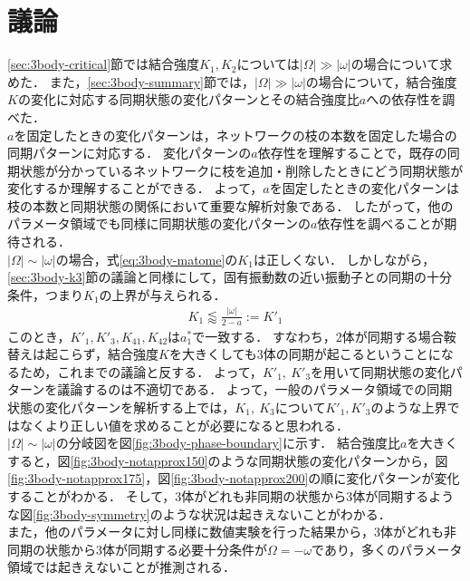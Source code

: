 \documentclass[../main]{subfiles}
\begin{document}
\section{議論}
\ref{sec:3body-critical}節では結合強度$K_1,K_2$については$|\Omega|\gg|\omega|$の場合について求めた．
また，\ref{sec:3body-summary}節では，$|\Omega|\gg|\omega|$の場合について，結合強度$K$の変化に対応する同期状態の変化パターンとその結合強度比$a$への依存性を調べた．\\
$a$を固定したときの変化パターンは，ネットワークの枝の本数を固定した場合の同期パターンに対応する．
変化パターンの$a$依存性を理解することで，既存の同期状態が分かっているネットワークに枝を追加・削除したときにどう同期状態が変化するか理解することができる．
よって，$a$を固定したときの変化パターンは枝の本数と同期状態の関係において重要な解析対象である．
したがって，他のパラメータ領域でも同様に同期状態の変化パターンの$a$依存性を調べることが期待される．\\
$|\Omega|\sim|\omega|$の場合，式\eqref{eq:3body-matome}の$K_1$は正しくない．
しかしながら，\ref{sec:3body-k3}節の議論と同様にして，固有振動数の近い振動子との同期の十分条件，つまり$K_1$の上界が与えられる．
\begin{align*}
    K_1\lessapprox\frac{|\omega|}{2-a}:=K'_1
\end{align*}
このとき，$K'_1, K'_3, K_{41}, K_{42}$は$a^\ast_1$で一致する．
すなわち，2体が同期する場合鞍替えは起こらず，結合強度$K$を大きくしても3体の同期が起こるということになるため，これまでの議論と反する．
よって，$K'_1,\ K'_3$を用いて同期状態の変化パターンを議論するのは不適切である．
よって，一般のパラメータ領域での同期状態の変化パターンを解析する上では，$K_1,\ K_3$について$K'_1,K'_3$のような上界ではなくより正しい値を求めることが必要になると思われる．\\
$|\Omega|\sim|\omega|$の分岐図を図\ref{fig:3body-phase-boundary}に示す．
結合強度比$a$を大きくすると，図\ref{fig:3body-notapprox150}のような同期状態の変化パターンから，図\ref{fig:3body-notapprox175}，図\ref{fig:3body-notapprox200}の順に変化パターンが変化することがわかる．
そして，3体がどれも非同期の状態から3体が同期するような図\ref{fig:3body-symmetry}のような状況は起きえないことがわかる．\\
また，他のパラメータに対し同様に数値実験を行った結果から，3体がどれも非同期の状態から3体が同期する必要十分条件が$\Omega=-\omega$であり，多くのパラメータ領域では起きえないことが推測される．
\end{document}
